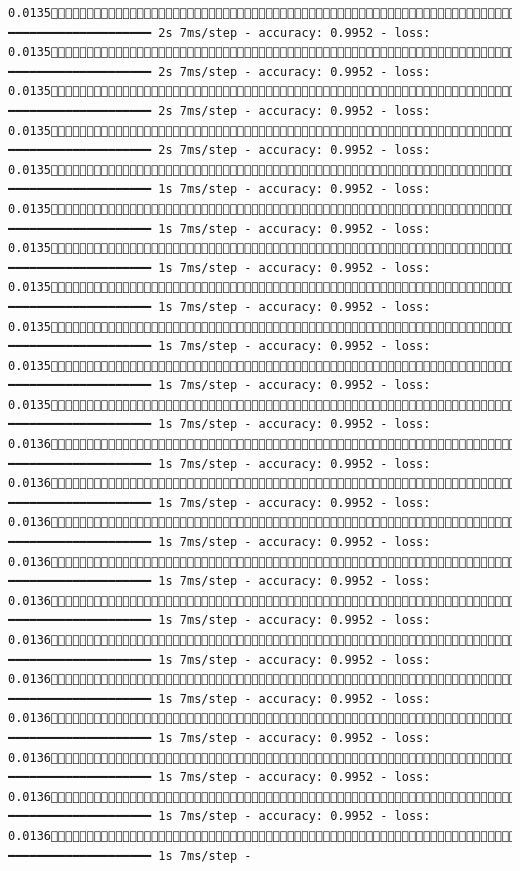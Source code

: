 \documentclass[
  letterpaper,
  DIV=11,
  numbers=noendperiod]{scrreprt}
\begin{document}
\begin{verbatim}
0.01351576/1875 ━━━━━━━━━━━━━━━━━━━━ 2s 7ms/step - accuracy: 0.9952 - loss: 0.01351583/1875 ━━━━━━━━━━━━━━━━━━━━ 2s 7ms/step - accuracy: 0.9952 - loss: 0.01351591/1875 ━━━━━━━━━━━━━━━━━━━━ 2s 7ms/step - accuracy: 0.9952 - loss: 0.01351599/1875 ━━━━━━━━━━━━━━━━━━━━ 2s 7ms/step - accuracy: 0.9952 - loss: 0.01351607/1875 ━━━━━━━━━━━━━━━━━━━━ 1s 7ms/step - accuracy: 0.9952 - loss: 0.01351615/1875 ━━━━━━━━━━━━━━━━━━━━ 1s 7ms/step - accuracy: 0.9952 - loss: 0.01351622/1875 ━━━━━━━━━━━━━━━━━━━━ 1s 7ms/step - accuracy: 0.9952 - loss: 0.01351629/1875 ━━━━━━━━━━━━━━━━━━━━ 1s 7ms/step - accuracy: 0.9952 - loss: 0.01351636/1875 ━━━━━━━━━━━━━━━━━━━━ 1s 7ms/step - accuracy: 0.9952 - loss: 0.01351644/1875 ━━━━━━━━━━━━━━━━━━━━ 1s 7ms/step - accuracy: 0.9952 - loss: 0.01351652/1875 ━━━━━━━━━━━━━━━━━━━━ 1s 7ms/step - accuracy: 0.9952 - loss: 0.01361660/1875 ━━━━━━━━━━━━━━━━━━━━ 1s 7ms/step - accuracy: 0.9952 - loss: 0.01361668/1875 ━━━━━━━━━━━━━━━━━━━━ 1s 7ms/step - accuracy: 0.9952 - loss: 0.01361676/1875 ━━━━━━━━━━━━━━━━━━━━ 1s 7ms/step - accuracy: 0.9952 - loss: 0.01361683/1875 ━━━━━━━━━━━━━━━━━━━━ 1s 7ms/step - accuracy: 0.9952 - loss: 0.01361691/1875 ━━━━━━━━━━━━━━━━━━━━ 1s 7ms/step - accuracy: 0.9952 - loss: 0.01361698/1875 ━━━━━━━━━━━━━━━━━━━━ 1s 7ms/step - accuracy: 0.9952 - loss: 0.01361705/1875 ━━━━━━━━━━━━━━━━━━━━ 1s 7ms/step - accuracy: 0.9952 - loss: 0.01361713/1875 ━━━━━━━━━━━━━━━━━━━━ 1s 7ms/step - accuracy: 0.9952 - loss: 0.01361721/1875 ━━━━━━━━━━━━━━━━━━━━ 1s 7ms/step - accuracy: 0.9952 - loss: 0.01361728/1875 ━━━━━━━━━━━━━━━━━━━━ 1s 7ms/step - accuracy: 0.9952 - loss: 0.01361735/1875 ━━━━━━━━━━━━━━━━━━━━ 1s 7ms/step - 
\end{verbatim}
\end{document}
